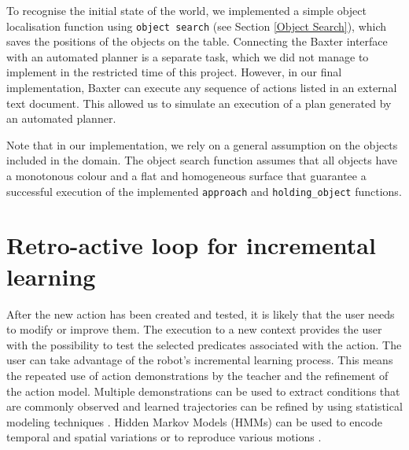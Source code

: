 To recognise the initial state of the world, we implemented a simple object localisation function using \texttt{object search} (see Section \ref{Object Search}), which saves the positions of the objects on the table.
Connecting the Baxter interface with an automated planner is a separate task, which we did not manage to implement in the restricted time of this project.
However, in our final implementation, Baxter can execute any sequence of actions listed in an external text document.
This allowed us to simulate an execution of a plan generated by an automated planner.

Note that in our implementation, we rely on a general assumption on the objects included in the domain.
The object search function assumes that all objects have a monotonous colour and a flat and homogeneous surface that guarantee a successful execution of the implemented \texttt{approach} and \texttt{holding_object} functions.



%

\section{Retro-active loop for incremental learning}
After the new action has been created and tested, it is likely that the user needs to modify or improve them.
The execution to a new context provides the user with the possibility to test the selected predicates associated with the action.
The user can take advantage of the robot's incremental learning process.
This means the repeated use of action demonstrations by the teacher and the refinement of the action model.
Multiple demonstrations can be used to extract conditions that are commonly observed and learned trajectories can be refined by using statistical modeling techniques \cite{ude1993trajectory}.
Hidden Markov Models (HMMs) can be used to encode temporal and spatial variations or to reproduce various motions \cite{tso1996hidden}.
